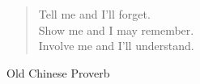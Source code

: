 \begin{center}
    \begin{quote}
    Tell me and I'll forget. \\
    Show me and I may remember.\\
    Involve me and I'll understand.
    \end{quote}
    Old Chinese Proverb
\end{center}
